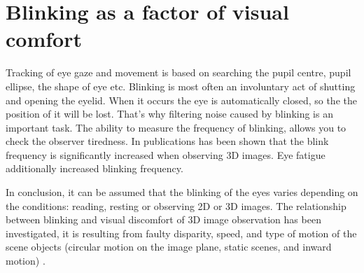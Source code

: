 \documentclass[conference]{IEEEtran}
\begin{document}
\section{Blinking as a factor of visual comfort}
Tracking of eye gaze and movement is based on searching the pupil centre, pupil ellipse, the shape of eye etc. Blinking is most often an involuntary act of shutting and opening the eyelid. When it occurs the eye is automatically closed, so the the position of it will be lost. That's why filtering noise caused by blinking is an important task. The ability to measure the frequency of blinking, allows you to check the observer tiredness. In publications \cite{5606312, 6211573} has been shown that the blink frequency is significantly increased when observing 3D images. Eye fatigue additionally increased blinking frequency. 
\par In conclusion, it can be assumed that the blinking of the eyes varies depending on the conditions: reading, resting or observing 2D or 3D images. The relationship between blinking and visual discomfort of 3D image observation has been investigated, it is resulting from faulty disparity, speed, and type of motion of the scene objects (circular motion on the image plane, static scenes, and inward motion) \cite{00789026}. 
\end{document}
